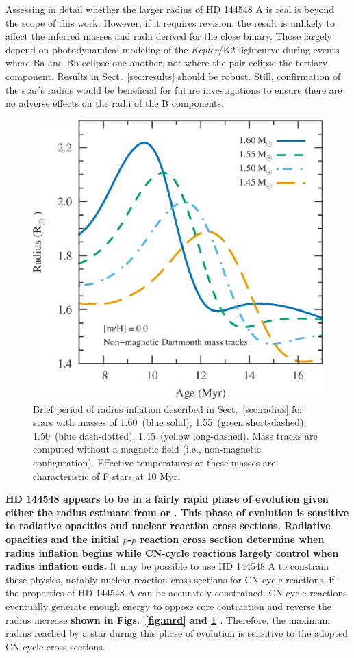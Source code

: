 \documentclass{aa}
\begin{document}
Assessing in detail whether the larger radius of HD 144548 A is real is beyond the scope of this work. However, if it requires revision, the result is unlikely to affect the inferred masses and radii derived for the close binary. Those largely depend on photodynamical modeling of the \emph{Kepler}/K2 lightcurve during events where Ba and Bb eclipse one another, not where the pair eclipse the tertiary component. Results in Sect.~\ref{sec:results} should be robust. Still, confirmation of the star's radius would be beneficial for future investigations to ensure there are no adverse effects on the radii of the B components. 

\begin{figure}[t]
    \centering
    \includegraphics[width=0.85\linewidth]{radius_bump.eps}
    \caption{Brief period of radius inflation described in Sect.~\ref{sec:radius} for stars with masses of 1.60\msun\ (blue solid), 1.55\msun\ (green short-dashed), 1.50\msun\ (blue dash-dotted), 1.45\msun\ (yellow long-dashed). Mass tracks are computed without a magnetic field (i.e., non-magnetic configuration). Effective temperatures at these masses are characteristic of F stars at 10 Myr.}
    \label{fig:bump}
\end{figure}

{\bf HD 144548 appears to be in a fairly rapid phase of evolution given either the radius estimate from \cite{Pecaut2012} or \citet{Alonso2015}. This phase of evolution is sensitive to radiative opacities and nuclear reaction cross sections. Radiative opacities and the initial $p$-$p$ reaction cross section determine when radius inflation begins while CN-cycle reactions largely control when radius inflation ends.} It may be possible to use HD 144548 A to constrain these physics, notably nuclear reaction cross-sections for CN-cycle reactions, if the properties of HD 144548 A can be accurately constrained. CN-cycle reactions eventually generate enough energy to oppose core contraction and reverse the radius increase {\bf shown in Figs.\ \ref{fig:mrd} and \ref{fig:bump} \citep[also see][]{Stassun2014}}. Therefore, the maximum radius reached by a star during this phase of evolution is sensitive to the adopted CN-cycle cross sections. 
\end{document}
